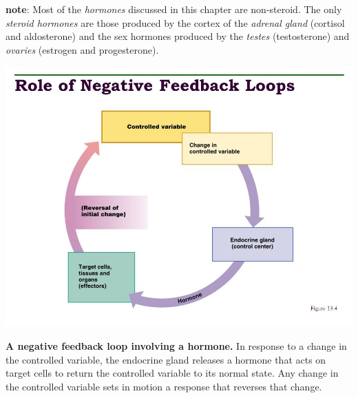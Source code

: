 \documentclass[11pt]{article}
\begin{document}
\textbf{note}: Most of the \emph{hormones} discussed in this chapter are non-steroid. The only
\emph{steroid hormones} are those produced by the cortex of the \emph{adrenal gland} (cortisol
and aldosterone) and the sex hormones produced by the \emph{testes} (testosterone) and
\emph{ovaries} (estrogen and progesterone).

\begin{center}
\includegraphics[width=.9\linewidth]{Ch. 13/slide_8_2016-11-07_11-46-51.jpg}
\end{center}

\textbf{A negative feedback loop involving a hormone.} In response to a change in the
controlled variable, the endocrine gland releases a hormone that acts on target
cells to return the controlled variable to its normal state. Any change in the
controlled variable sets in motion a response that reverses that change.
\end{document}
